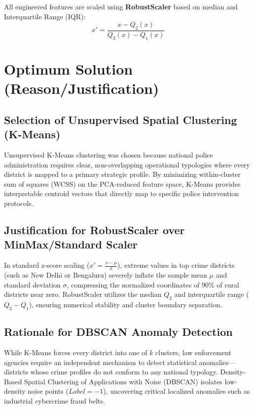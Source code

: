 \documentclass[12pt,a4paper]{report}
\begin{document}
All engineered features are scaled using \textbf{RobustScaler} based on median and Interquartile Range (IQR):
\begin{equation}
x' = \frac{x - Q_2(x)}{Q_3(x) - Q_1(x)}
\end{equation}

\chapter{Optimum Solution (Reason/Justification)}

\section{Selection of Unsupervised Spatial Clustering (K-Means)}
Unsupervised K-Means clustering was chosen because national police administration requires clear, non-overlapping operational typologies where every district is mapped to a primary strategic profile. By minimizing within-cluster sum of squares (WCSS) on the PCA-reduced feature space, K-Means provides interpretable centroid vectors that directly map to specific police intervention protocols.

\section{Justification for RobustScaler over MinMax/Standard Scaler}
In standard z-score scaling ($x' = \frac{x - \mu}{\sigma}$), extreme values in top crime districts (such as New Delhi or Bengaluru) severely inflate the sample mean $\mu$ and standard deviation $\sigma$, compressing the normalized coordinates of 90\% of rural districts near zero. RobustScaler utilizes the median $Q_2$ and interquartile range ($Q_3 - Q_1$), ensuring numerical stability and cluster boundary separation.

\section{Rationale for DBSCAN Anomaly Detection}
While K-Means forces every district into one of $k$ clusters, law enforcement agencies require an independent mechanism to detect statistical anomalies—districts whose crime profiles do not conform to any national typology. Density-Based Spatial Clustering of Applications with Noise (DBSCAN) isolates low-density noise points ($Label = -1$), uncovering critical localized anomalies such as industrial cybercrime fraud belts.
\end{document}

